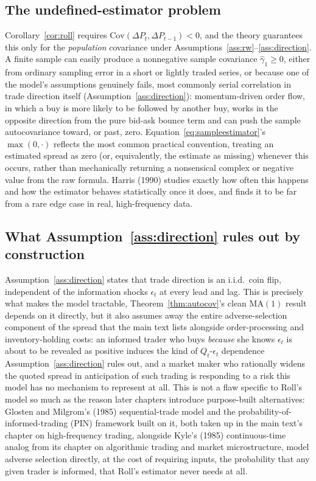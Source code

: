 \documentclass[11pt]{article}
\theoremstyle{remark}
\theoremstyle{definition}
\begin{document}
\subsection{The undefined-estimator problem}
Corollary~\ref{cor:roll} requires $\mathrm{Cov}(\Delta P_t,\Delta P_{t-1})<0$, and the theory guarantees this only for the \emph{population} covariance under Assumptions~\ref{ass:rw}--\ref{ass:direction}. A finite sample can easily produce a nonnegative sample covariance $\hat\gamma_1 \ge 0$, either from ordinary sampling error in a short or lightly traded series, or because one of the model's assumptions genuinely fails, most commonly serial correlation in trade direction itself (Assumption~\ref{ass:direction}): momentum-driven order flow, in which a buy is more likely to be followed by another buy, works in the opposite direction from the pure bid-ask bounce term and can push the sample autocovariance toward, or past, zero. Equation~\eqref{eq:sampleestimator}'s $\max(0,\cdot)$ reflects the most common practical convention, treating an estimated spread as zero (or, equivalently, the estimate as missing) whenever this occurs, rather than mechanically returning a nonsensical complex or negative value from the raw formula. Harris (1990) studies exactly how often this happens and how the estimator behaves statistically once it does, and finds it to be far from a rare edge case in real, high-frequency data.

\subsection{What Assumption~\ref{ass:direction} rules out by construction}
Assumption~\ref{ass:direction} states that trade direction is an i.i.d.\ coin flip, independent of the information shocks $\epsilon_t$ at every lead and lag. This is precisely what makes the model tractable, Theorem~\ref{thm:autocov}'s clean $\mathrm{MA}(1)$ result depends on it directly, but it also assumes away the entire adverse-selection component of the spread that the main text lists alongside order-processing and inventory-holding costs: an informed trader who buys \emph{because} she knows $\epsilon_t$ is about to be revealed as positive induces the kind of $Q_t$-$\epsilon_t$ dependence Assumption~\ref{ass:direction} rules out, and a market maker who rationally widens the quoted spread in anticipation of such trading is responding to a risk this model has no mechanism to represent at all. This is not a flaw specific to Roll's model so much as the reason later chapters introduce purpose-built alternatives: Glosten and Milgrom's (1985) sequential-trade model and the probability-of-informed-trading (PIN) framework built on it, both taken up in the main text's chapter on high-frequency trading, alongside Kyle's (1985) continuous-time analog from its chapter on algorithmic trading and market microstructure, model adverse selection directly, at the cost of requiring inputs, the probability that any given trader is informed, that Roll's estimator never needs at all.
\end{document}
